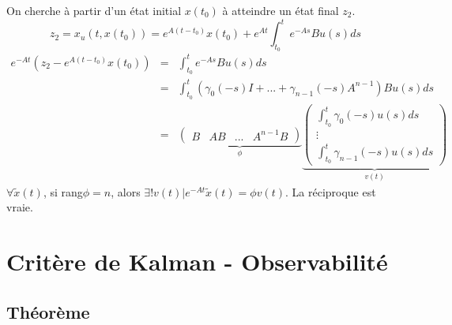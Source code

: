 \begin{dem}
On cherche à partir d'un état initial $x(t_0)$ à atteindre un état final $z_2$.
\[z_2=x_u(t,x(t_0))=e^{A(t-t_0)}x(t_0)+e^{At}\int_{t_0}^t e^{-As}Bu(s) ds\]
\begin{eqnarray*}
e^{-At}\left(z_2-e^{A(t-t_0)}x(t_0)\right)&=&\int_{t_0}^t e^{-As}Bu(s) ds\\
					&=&\int_{t_0}^t \left(\gamma_0(-s)I+...+\gamma_{n-1}(-s)A^{n-1}\right)Bu(s)ds \\
					&=&\underbrace{\begin{pmatrix}B & AB & ... & A^{n-1}B\end{pmatrix}}_{\phi} \underbrace{\begin{pmatrix}\int_{t_0}^t \gamma_0(-s)u(s) ds \\ \vdots \\ \int_{t_0}^t \gamma_{n-1}(-s)u(s)ds  \end{pmatrix}}_{v(t)}
\end{eqnarray*}
$\forall \tilde{x}(t)$, si rang$\phi=n$, alors $\exists ! v(t) | e^{-At}\tilde{x}(t)=\phi v(t)$. La réciproque est vraie.
\end{dem}



\section{Critère de Kalman - Observabilité}
\subsection{Théorème}

